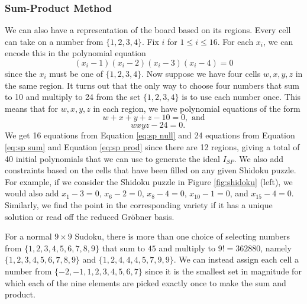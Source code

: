 \documentclass[../main.tex]{subfiles}
\begin{document}
            \subsubsection{Sum-Product Method} \label{sec:sumproduct}

            We can also have a representation of the board based on its regions. Every cell can take on a number from $\{1,2,3,4\}$. Fix $i$ for $1\leq i\leq 16$. For each $x_i$, we can encode this in the polynomial equation
            \begin{equation}
                \label{eq:sp null}
                (x_i-1)(x_i-2)(x_i-3)(x_i-4)=0
            \end{equation}
            since the $x_i$ must be one of $\{1,2,3,4\}$. Now suppose we have four cells $w,x,y,z$ in the same region. It turns out that the only way to choose four numbers that sum to 10 and multiply to 24 from the set $\{1,2,3,4\}$ is to use each number once. This means that for $w,x,y,z$ in each region, we have polynomial equations of the form
            \begin{equation}
                \label{eq:sp sum}
                w+x+y+z-10=0, \text{ and} 
            \end{equation}
            \begin{equation}
                \label{eq:sp prod}
                \quad wxyz -24 = 0.
            \end{equation}
            We get 16 equations from Equation \ref{eq:sp null} and 24 equations from Equation \ref{eq:sp sum} and Equation \ref{eq:sp prod} since there are 12 regions, giving a total of 40 initial polynomials that we can use to generate the ideal $I_{SP}$. We also add constraints based on the cells that have been filled on any given Shidoku puzzle. For example, if we consider the Shidoku puzzle in Figure \ref{fig:shidoku} (left), we would also add $x_1-3=0$, $x_6-2=0$, $x_8-4=0$, $x_{10}-1=0$, and $x_{15}-4=0$. Similarly, we find the point in the corresponding variety if it has a unique solution or read off the reduced Gr\"obner basis.

            \begin{sloppypar}
            \begin{remark}
                For a normal $9\times 9$ Sudoku, there is more than one choice of selecting numbers from $\{1,2,3,4,5,6,7,8,9\}$ that sum to $45$ and multiply to $9!=362880$, namely $\{1,2,3,4,5,6,7,8,9\}$ and $\{1,2,4,4,4,5,7,9,9\}$. We can instead assign each cell a number from $\{-2,-1,1,2,3,4,5,6,7\}$ since it is the smallest set in magnitude for which each of the nine elements are picked exactly once to make the sum and product.
            \end{remark}
            \end{sloppypar}
\end{document}
